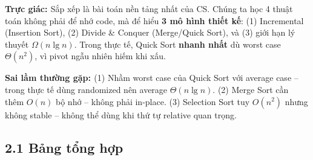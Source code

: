\documentclass[10pt]{article}
\newcommand{\intuition}[1]{%
  \begin{tcolorbox}[colback=blue!5!white, colframe=blue!60!white, leftrule=3pt,
    toprule=0pt, bottomrule=0pt, rightrule=0pt,
    boxsep=2pt, left=6pt, right=6pt, top=4pt, bottom=4pt]
  \small\textbf{\textcolor{blue!80!black}{Trực giác: }}#1
  \end{tcolorbox}}
\newcommand{\pitfall}[1]{%
  \begin{tcolorbox}[colback=red!5!white, colframe=red!60!white, leftrule=3pt,
    toprule=0pt, bottomrule=0pt, rightrule=0pt,
    boxsep=2pt, left=6pt, right=6pt, top=4pt, bottom=4pt]
  \small\textbf{\textcolor{red!70!black}{Sai lầm thường gặp: }}#1
  \end{tcolorbox}}
\begin{document}
\intuition{Sắp xếp là bài toán nền tảng nhất của CS. Chúng ta học 4 thuật toán không phải để nhớ code, mà để hiểu \textbf{3 mô hình thiết kế}: (1) Incremental (Insertion Sort), (2) Divide \& Conquer (Merge/Quick Sort), và (3) giới hạn lý thuyết $\Omega(n \lg n)$. Trong thực tế, Quick Sort \textbf{nhanh nhất} dù worst case $\Theta(n^2)$, vì pivot ngẫu nhiên hiếm khi xấu.}

\pitfall{(1) Nhầm worst case của Quick Sort với average case -- trong thực tế dùng randomized nên average $\Theta(n \lg n)$. (2) Merge Sort cần thêm $O(n)$ bộ nhớ -- không phải in-place. (3) Selection Sort tuy $O(n^2)$ nhưng không stable -- không thể dùng khi thứ tự relative quan trọng.}

\subsection{2.1 Bảng tổng hợp}\label{bux1ea3ng-tux1ed5ng-hux1ee3p}
\end{document}

